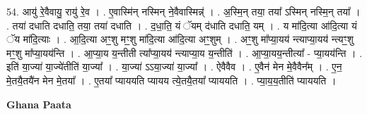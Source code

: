 \documentclass[17pt]{extarticle}
\begin{document}
54. आयु॑ रे॒वैवायु॒ रायु॑ रे॒व । . ए॒वास्मि॑न् नस्मिन् ने॒वैवास्मिन्न्॑ । . अ॒स्मि॒न् तया॒ तया᳚ ऽस्मिन् नस्मि॒न् तया᳚ । . तया॑ दधाति दधाति॒ तया॒ तया॑ दधाति । . द॒धा॒ति॒ यं ॅयम् द॑धाति दधाति॒ यम् । . य मा॑दि॒त्या आ॑दि॒त्या यं ॅय मा॑दि॒त्याः । . आ॒दि॒त्या अꣳ॒॒शु मꣳ॒॒शु मा॑दि॒त्या आ॑दि॒त्या अꣳ॒॒शुम् । . अꣳ॒॒शु मा᳚प्या॒यय॑ न्त्याप्या॒यय॑ न्त्यꣳ॒॒शु मꣳ॒॒शु मा᳚प्या॒यय॑न्ति । . आ॒प्या॒य य॒न्तीती त्या᳚प्या॒यय॑ न्त्याप्या॒य य॒न्तीति॑ । . आ॒प्या॒यय॒न्तीत्या᳚ - प्या॒यय॑न्ति । . इति॑ या॒ज्या॑ या॒ज्ये॑तीति॑ या॒ज्या᳚ । . या॒ज्या॑ ऽऽया॒ज्या॑ या॒ज्या᳚ । . ऐवैवैव । . ए॒वैन॑ मेन मे॒वैवैन᳚म् । . ए॒न॒ मे॒तयै॒तयै॑न मेन मे॒तया᳚ । . ए॒तया᳚ प्याययति प्यायय त्ये॒तयै॒तया᳚ प्याययति । . प्या॒य॒य॒तीति॑ प्याययति । \newline

\textbf{Ghana Paata } \newline
\end{document}
